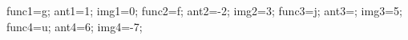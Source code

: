 \documentclass[exercice]{thedocument}%
\begin{document}
%
    \>func1=g;%
    \>ant1=1;%
    \>img1=0;%
    \>func2=f;%
    \>ant2=-2;%
    \>img2=3;%
    \>func3=j;%
    \>ant3=;%
    \>img3=5;%
    \>func4=u;%
    \>ant4=6;%
    \>img4=-7;%
\end{document}

